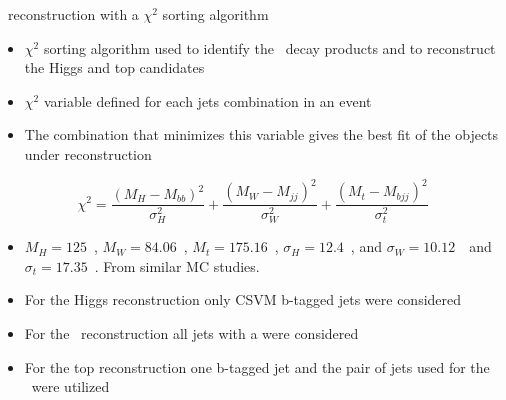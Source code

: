\begin{frame}{\Tp~reconstruction with a $\chi^{2}$ sorting algorithm}
\vspace{-.2cm}
\scriptsize

\begin{itemize}
\item $\chi^{2}$ sorting algorithm used to identify the \Tp~decay products and to reconstruct the Higgs and top candidates
\item $\chi^{2}$ variable defined for each jets combination in an event
\item The combination that minimizes this variable gives the best fit of the objects under reconstruction
\end{itemize}

\begin{equation*}
\chi^{2}=\frac{(M_{H}-M_{bb})^{2}}{\sigma_{H}^{2}}+\frac{(M_{W}-M_{jj})^{2}}{\sigma_{W}^{2}}+\frac{(M_{t}-M_{bjj})^{2}}{\sigma_{t}^{2}}
\end{equation*}

\begin{itemize}
\item $M_{H}=125$~\GeVcc, $M_{W}=84.06$~\GeVcc, $M_{t}=175.16$~\GeVcc, $\sigma_{H}=12.4$~\GeVcc, and $\sigma_{W}=10.12$~\GeVcc~and $\sigma_{t}=17.35$~\GeVcc. From similar MC studies.
\item For the Higgs reconstruction only CSVM b-tagged jets were considered
\item For the \W~reconstruction all jets with a  were considered
\item For the top reconstruction one b-tagged jet and the pair of jets used for the \W~were utilized
\end{itemize}

\end{frame}


